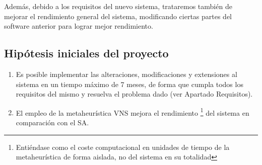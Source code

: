 Además, debido a los requisitos del nuevo sistema, trataremos también de mejorar el rendimiento general del sistema, modificando ciertas partes del software anterior para lograr mejor rendimiento.

\subsection{Hipótesis iniciales del proyecto}
\label{sec:Hipotesis}
\begin{enumerate}[label={H\arabic*}]
	\item \label{H1} Es posible implementar las alteraciones, modificaciones y extensiones al sistema en un tiempo máximo de 7 meses, de forma que cumpla todos los requisitos del mismo y resuelva el problema dado (ver Apartado Requisitos). %
	\item \label{H2} El empleo de la metaheurística VNS mejora el rendimiento%
	\footnote{Entiéndase como el coste computacional en unidades de tiempo  de la metaheurística de forma aislada, no del sistema en su totalidad}
	del sistema en comparación con el SA.
\end{enumerate}

%
%
\glsaddall
\printglossary[title={Definiciones, acrónimos y abreviaturas}]
%
%
%